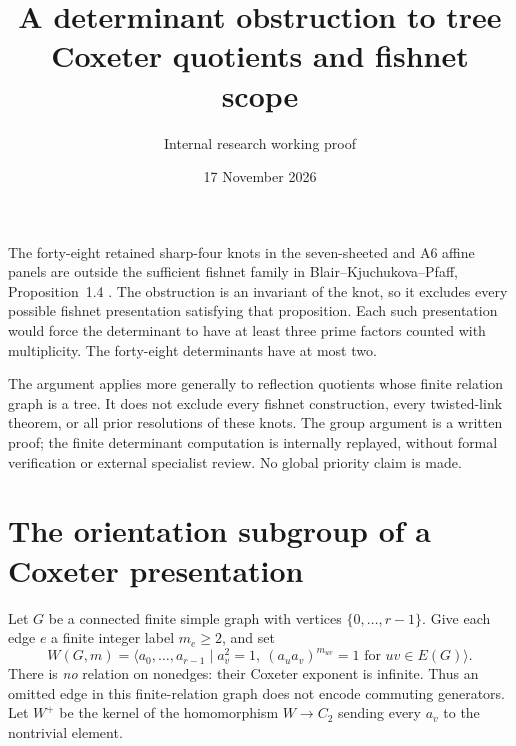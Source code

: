 \documentclass[11pt]{article}
\title{A determinant obstruction to tree Coxeter quotients and fishnet scope}
\author{Internal research working proof}
\date{17 November 2026}
\begin{document}
\maketitle

The forty-eight retained sharp-four knots in the seven-sheeted and
A6 affine panels are outside the sufficient fishnet family in Blair--Kjuchukova--Pfaff,
Proposition~1.4 \cite{bkp}.  The obstruction is an invariant of the
knot, so it excludes every possible fishnet presentation satisfying
that proposition.  Each such presentation would force the determinant
to have at least three prime factors counted with multiplicity.
The forty-eight determinants have at most two.

The argument applies more generally to reflection quotients whose
finite relation graph is a tree.  It does not exclude every fishnet
construction, every twisted-link theorem, or all prior resolutions of
these knots.  The group argument is a written proof; the finite
determinant computation is internally replayed, without formal
verification or external specialist review.  No global priority claim
is made.

\section{The orientation subgroup of a Coxeter presentation}

Let $G$ be a connected finite simple graph with vertices
$\{0,\ldots,r-1\}$.  Give each edge $e$ a finite integer label
$m_e\ge2$, and set
\[
 W(G,m)=\langle a_0,\ldots,a_{r-1}\mid
          a_v^2=1,\ (a_u a_v)^{m_{uv}}=1\text{ for }uv\in E(G)\rangle.
\]
There is \emph{no} relation on nonedges: their Coxeter exponent is
infinite.  Thus an omitted edge in this finite-relation graph does
not encode commuting generators.  Let $W^+$ be the kernel of the
homomorphism $W\to C_2$ sending every $a_v$ to the nontrivial element.
\end{document}
